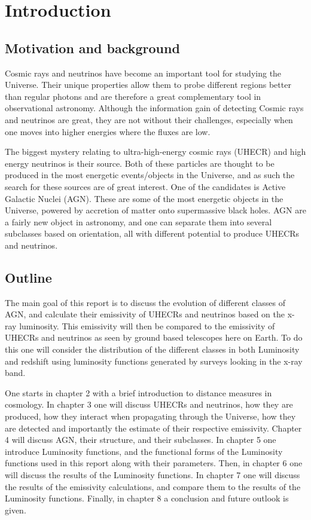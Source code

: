 \section{Introduction}
\subsection{Motivation and background}
Cosmic rays and neutrinos have become an important tool 
for studying the Universe. Their unique properties allow them to probe different regions better than
regular photons and are therefore a great complementary tool in observational astronomy. 
Although the information gain of detecting Cosmic rays and neutrinos are great, they are not without their challenges, 
especially when one moves into higher energies where the fluxes are low.  

The biggest mystery relating to ultra-high-energy cosmic rays (UHECR) and high energy neutrinos is their source.
Both of these particles are thought to be produced in the most energetic events/objects in the Universe, and as such the search for these 
sources are of great interest. One of the candidates is Active Galactic Nuclei (AGN). These are some of the most energetic objects in the Universe, powered by 
accretion of matter onto supermassive black holes. AGN are a fairly new object in astronomy, and one can separate them into several subclasses based on orientation, all with different potential
to produce UHECRs and neutrinos. 


\subsection{Outline}
The main goal of this report is to discuss the evolution of different classes of AGN, and calculate their emissivity of UHECRs and neutrinos based on the x-ray luminosity.
This emissivity will then be compared to the emissivity of UHECRs and neutrinos as seen by ground based 
telescopes here on Earth. To do this one will consider the distribution of the different classes in both Luminosity and redshift using luminosity functions generated by surveys looking in the x-ray band.

One starts in chapter 2 with a brief introduction to distance measures in cosmology. In chapter 3 one will discuss UHECRs and neutrinos, how they are produced, how they interact when propagating through the Universe, how they are detected and importantly the estimate of their respective emissivity.
Chapter 4 will discuss AGN, their structure, and their subclasses. In chapter 5 one introduce Luminosity functions, and the functional forms of the Luminosity functions used in this report along with their parameters.
Then, in chapter 6 one will discuss the results of the Luminosity functions. In chapter 7 one will discuss the results of the emissivity calculations, and compare them to the results of the Luminosity functions. 
Finally, in chapter 8 a conclusion and future outlook is given. 